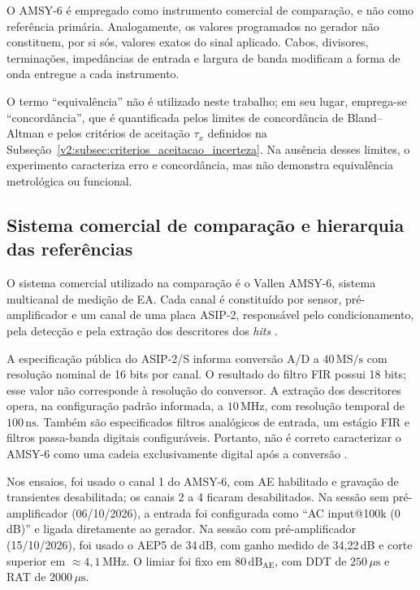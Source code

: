 O AMSY-6 é empregado como instrumento comercial de comparação, e não como referência primária. Analogamente, os valores programados no gerador não constituem, por si sós, valores exatos do sinal aplicado. Cabos, divisores, terminações, impedâncias de entrada e largura de banda modificam a forma de onda entregue a cada instrumento.

O termo ``equivalência'' não é utilizado neste trabalho; em seu lugar, emprega-se ``concordância'', que é quantificada pelos limites de concordância de Bland--Altman e pelos critérios de aceitação \(\tau_x\) definidos na Subseção~\ref{v2:subsec:criterios_aceitacao_incerteza}. Na ausência desses limites, o experimento caracteriza erro e concordância, mas não demonstra equivalência metrológica ou funcional.

\subsection{Sistema comercial de comparação e hierarquia das referências}
\label{v2:subsec:sistema_referencia_experimento}

O sistema comercial utilizado na comparação é o Vallen AMSY-6, sistema multicanal de medição de EA. Cada canal é constituído por sensor, pré-amplificador e um canal de uma placa ASIP-2, responsável pelo condicionamento, pela detecção e pela extração dos descritores dos \textit{hits} \cite{vallen2022}.

A especificação pública do ASIP-2/S informa conversão A/D a \(40\,\mathrm{MS/s}\) com resolução nominal de 16 bits por canal. O resultado do filtro FIR possui 18 bits; esse valor não corresponde à resolução do conversor. A extração dos descritores opera, na configuração padrão informada, a \(10\,\mathrm{MHz}\), com resolução temporal de \(100\,\mathrm{ns}\). Também são especificados filtros analógicos de entrada, um estágio FIR e filtros passa-banda digitais configuráveis. Portanto, não é correto caracterizar o AMSY-6 como uma cadeia exclusivamente digital após a conversão \cite{vallen2022}.

Nos ensaios, foi usado o canal 1 do AMSY-6, com AE habilitado e gravação de transientes desabilitada; os canais 2 a 4 ficaram desabilitados. Na sessão sem pré-amplificador (06/10/2026), a entrada foi configurada como ``AC input@100k (0 dB)'' e ligada diretamente ao gerador. Na sessão com pré-amplificador (15/10/2026), foi usado o AEP5 de 34\,dB, com ganho medido de 34,22\,dB e corte superior em \(\approx 4{,}1\,\mathrm{MHz}\). O limiar foi fixo em \(80\,\mathrm{dB}_{\mathrm{AE}}\), com DDT de \(250\,\mu\mathrm{s}\) e RAT de \(2000\,\mu\mathrm{s}\).

